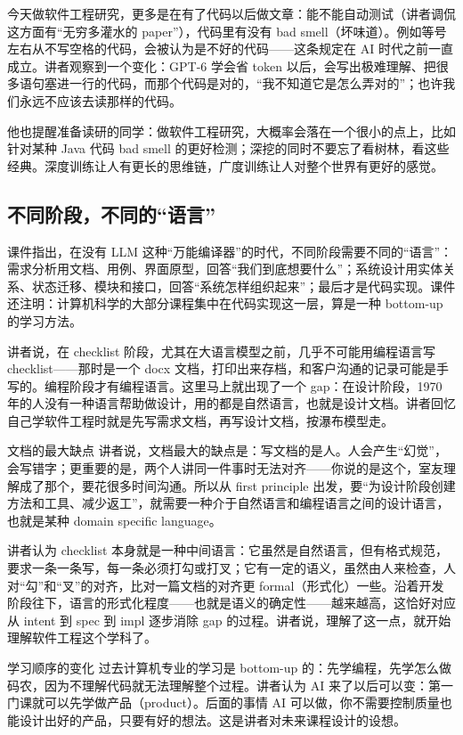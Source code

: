 \documentclass[a4paper]{article}
\begin{document}
今天做软件工程研究，更多是在有了代码以后做文章：能不能自动测试（讲者调侃这方面有“无穷多灌水的 paper”），代码里有没有 bad smell（坏味道）。例如等号左右从不写空格的代码，会被认为是不好的代码——这条规定在 AI 时代之前一直成立。讲者观察到一个变化：GPT-6 学会省 token 以后，会写出极难理解、把很多语句塞进一行的代码，而那个代码是对的，“我不知道它是怎么弄对的”；也许我们永远不应该去读那样的代码。

他也提醒准备读研的同学：做软件工程研究，大概率会落在一个很小的点上，比如针对某种 Java 代码 bad smell 的更好检测；深挖的同时不要忘了看树林，看这些经典。深度训练让人有更长的思维链，广度训练让人对整个世界有更好的感觉。

\subsection{不同阶段，不同的“语言”}

课件指出，在没有 LLM 这种“万能编译器”的时代，不同阶段需要不同的“语言”：需求分析用文档、用例、界面原型，回答“我们到底想要什么”；系统设计用实体关系、状态迁移、模块和接口，回答“系统怎样组织起来”；最后才是代码实现。课件还注明：计算机科学的大部分课程集中在代码实现这一层，算是一种 bottom-up 的学习方法。

讲者说，在 checklist 阶段，尤其在大语言模型之前，几乎不可能用编程语言写 checklist——那时是一个 docx 文档，打印出来存档，和客户沟通的记录可能是手写的。编程阶段才有编程语言。这里马上就出现了一个 gap：在设计阶段，1970 年的人没有一种语言帮助做设计，用的都是自然语言，也就是设计文档。讲者回忆自己学软件工程时就是先写需求文档，再写设计文档，按瀑布模型走。

\begin{warningbox}{文档的最大缺点}
讲者说，文档最大的缺点是：写文档的是人。人会产生“幻觉”，会写错字；更重要的是，两个人讲同一件事时无法对齐——你说的是这个，室友理解成了那个，要花很多时间沟通。所以从 first principle 出发，要“为设计阶段创建方法和工具、减少返工”，就需要一种介于自然语言和编程语言之间的设计语言，也就是某种 domain specific language。
\end{warningbox}

讲者认为 checklist 本身就是一种中间语言：它虽然是自然语言，但有格式规范，要求一条一条写，每一条必须打勾或打叉；它有一定的语义，虽然由人来检查，人对“勾”和“叉”的对齐，比对一篇文档的对齐更 formal（形式化）一些。沿着开发阶段往下，语言的形式化程度——也就是语义的确定性——越来越高，这恰好对应从 intent 到 spec 到 impl 逐步消除 gap 的过程。讲者说，理解了这一点，就开始理解软件工程这个学科了。

\begin{knowledgebox}{学习顺序的变化}
过去计算机专业的学习是 bottom-up 的：先学编程，先学怎么做码农，因为不理解代码就无法理解整个过程。讲者认为 AI 来了以后可以变：第一门课就可以先学做产品（product）。后面的事情 AI 可以做，你不需要控制质量也能设计出好的产品，只要有好的想法。这是讲者对未来课程设计的设想。
\end{knowledgebox}
\end{document}
